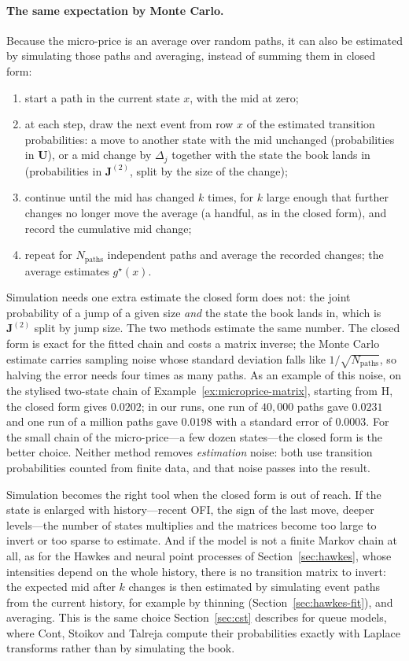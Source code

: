 \paragraph{The same expectation by Monte Carlo.} Because the micro-price is an average over random
paths, it can also be estimated by simulating those paths and averaging, instead of summing them in
closed form:
\begin{enumerate}[leftmargin=1.8em,itemsep=2pt]
\item start a path in the current state $x$, with the mid at zero;
\item at each step, draw the next event from row $x$ of the estimated transition probabilities: a move
  to another state with the mid unchanged (probabilities in $\mathbf{U}$), or a mid change by
  $\Delta_j$ together with the state the book lands in (probabilities in $\mathbf{J}^{(2)}$, split by the
  size of the change);
\item continue until the mid has changed $k$ times, for $k$ large enough that further changes no longer
  move the average (a handful, as in the closed form), and record the cumulative mid change;
\item repeat for $N_{\text{paths}}$ independent paths and average the recorded changes; the average
  estimates $g^{\star}(x)$.
\end{enumerate}
Simulation needs one extra estimate the closed form does not: the joint probability of a jump of a given
size \emph{and} the state the book lands in, which is $\mathbf{J}^{(2)}$ split by jump size. The two
methods estimate the same number. The closed form is exact for the fitted chain and costs a matrix
inverse; the Monte Carlo estimate carries sampling noise whose standard deviation falls like
$1/\sqrt{N_{\text{paths}}}$, so halving the error needs four times as many paths. As an example of this noise, on the stylised two-state chain of
Example~\ref{ex:microprice-matrix}, starting from H, the closed form gives $0.0202$; in our runs, one
run of $40{,}000$ paths gave $0.0231$ and one run of a million paths gave $0.0198$ with a
standard error of $0.0003$. For the small chain of
the micro-price---a few dozen states---the closed form is the better choice. Neither method removes
\emph{estimation} noise: both use transition probabilities counted from finite data, and that noise
passes into the result.

Simulation becomes the right tool when the closed form is out of reach. If the state is enlarged with
history---recent OFI, the sign of the last move, deeper levels---the number of states multiplies and the
matrices become too large to invert or too sparse to estimate. And if the model is not a finite Markov
chain at all, as for the Hawkes and neural point processes of Section~\ref{sec:hawkes}, whose intensities
depend on the whole history, there is no transition matrix to invert: the expected mid after $k$ changes
is then estimated by simulating event paths from the current history, for example by thinning
(Section~\ref{sec:hawkes-fit}), and averaging. This is the same choice Section~\ref{sec:cst} describes
for queue models, where Cont, Stoikov and Talreja compute their probabilities exactly with Laplace
transforms rather than by simulating the book.

